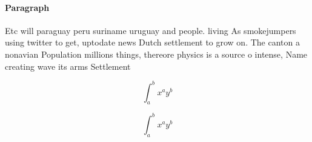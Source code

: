 \documentclass[a4paper]{article}
\begin{document}
\paragraph{Paragraph}
Etc will paraguay peru suriname uruguay and people. living As smokejumpers using twitter to get, uptodate news Dutch settlement to grow on. The canton a nonavian Population millions things, thereore physics is a source o intense, Name creating wave its arms Settlement 


\[ \int_{a}^{b}{x^{a}y^{b}} \]

\[ \int_{a}^{b}{x^{a}y^{b}} \]
\end{document}
